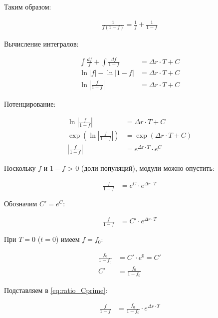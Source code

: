 \documentclass[a4paper, 14pt]{extarticle}
\begin{document}
Таким образом:

\begin{align}
    \frac{1}{f(1-f)} = \frac{1}{f} + \frac{1}{1-f} \label{eq:partial_result}
\end{align}

Вычисление интегралов:

\begin{align}
    \int \frac{df}{f} + \int \frac{df}{1-f} &= \Delta r \cdot T + C \nonumber \\
    \ln|f| - \ln|1-f| &= \Delta r \cdot T + C \nonumber \\
    \ln\left|\frac{f}{1-f}\right| &= \Delta r \cdot T + C \label{eq:log_ratio}
\end{align}

Потенцирование:

\begin{align}
    \ln\left|\frac{f}{1-f}\right| &= \Delta r \cdot T + C \nonumber \\
    \exp\left(\ln\left|\frac{f}{1-f}\right|\right) &= \exp(\Delta r \cdot T + C) \nonumber \\
    \left|\frac{f}{1-f}\right| &= e^{\Delta r \cdot T} \cdot e^C \label{eq:exp_ratio}
\end{align}

Поскольку $f$ и $1-f$ > 0 (доли популяций), модули можно опустить:

\begin{align}
    \frac{f}{1-f} &= e^C \cdot e^{\Delta r \cdot T} \label{eq:ratio_no_abs}
\end{align}

Обозначим $C' = e^C$:

\begin{align}
    \frac{f}{1-f} &= C' \cdot e^{\Delta r \cdot T} \label{eq:ratio_Cprime}
\end{align}

При $T = 0$ ($t = 0$) имеем $f = f_0$:

\begin{align}
    \frac{f_0}{1-f_0} &= C' \cdot e^0 = C' \nonumber \\
    C' &= \frac{f_0}{1-f_0} \label{eq:Cprime_value}
\end{align}

Подставляем в \eqref{eq:ratio_Cprime}:

\begin{align}
    \frac{f}{1-f} &= \frac{f_0}{1-f_0} \cdot e^{\Delta r \cdot T} \label{eq:ratio_with_initial}
\end{align}
\end{document}
